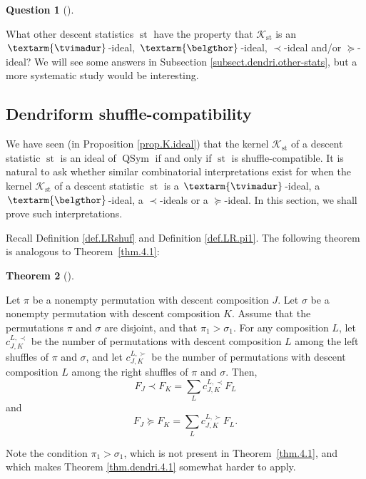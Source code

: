 \documentclass[numbers=enddot,12pt,final,onecolumn,notitlepage]{scrartcl}%
\theoremstyle{definition}
\newtheorem{theo}{Theorem}[section]
\newenvironment{theorem}[1][]
{\begin{theo}[#1]\begin{leftbar}}
{\end{leftbar}\end{theo}}
\newtheorem{quest}[theo]{Question}
\newenvironment{question}[1][]
{\begin{quest}[#1]\begin{leftbar}}
{\end{leftbar}\end{quest}}
\newenvironment{question}[1][Question]{\noindent\textbf{#1.} }{\ \rule{0.5em}{0.5em}}
\newenvironment{verlong}{}{}
\newcommand{\tvi}{\left. \textarm{\tvimadur} \right.}
\newcommand{\bel}{\left. \textarm{\belgthor} \right.}
\let\sumnonlimits\sum
\renewcommand{\sum}{\sumnonlimits\limits}
\begin{document}
\begin{verlong}
\begin{question}
What other descent statistics $\operatorname*{st}$ have the property that
$\mathcal{K}_{\operatorname*{st}}$ is an $\tvi$-ideal, $\bel$-ideal, $\left.
\prec\right.  $-ideal and/or $\left.  \succeq\right.  $-ideal? We will see
some answers in Subsection \ref{subsect.dendri.other-stats}, but a more
systematic study would be interesting.
\end{question}

\subsection{Dendriform shuffle-compatibility}

We have seen (in Proposition \ref{prop.K.ideal}) that the kernel
$\mathcal{K}_{\operatorname*{st}}$ of a descent statistic $\operatorname*{st}$
is an ideal of $\operatorname*{QSym}$ if and only if $\operatorname*{st}$ is
shuffle-compatible. It is natural to ask whether similar combinatorial
interpretations exist for when the kernel $\mathcal{K}_{\operatorname*{st}}$
of a descent statistic $\operatorname*{st}$ is a $\tvi$-ideal, a $\bel$-ideal,
a $\left.  \prec\right.  $-ideals or a $\left.  \succeq\right.  $-ideal. In
this section, we shall prove such interpretations.

Recall Definition \ref{def.LRshuf} and Definition \ref{def.LR.pi1}. The
following theorem is analogous to Theorem~\ref{thm.4.1}:

\begin{theorem}
\label{thm.dendri.4.1}Let $\pi$ be a nonempty permutation with descent
composition $J$. Let $\sigma$ be a nonempty permutation with descent
composition $K$. Assume that the permutations $\pi$ and $\sigma$ are disjoint,
and that $\pi_{1}>\sigma_{1}$. For any composition $L$, let $c_{J,K}^{L,\prec
}$ be the number of permutations with descent composition $L$ among the left
shuffles of $\pi$ and $\sigma$, and let $c_{J,K}^{L,\succ}$ be the number of
permutations with descent composition $L$ among the right shuffles of $\pi$
and $\sigma$. Then,%
\[
F_{J}\left.  \prec\right.  F_{K}=\sum_{L}c_{J,K}^{L,\prec}F_{L}%
\]
and%
\[
F_{J}\left.  \succeq\right.  F_{K}=\sum_{L}c_{J,K}^{L,\succ}F_{L}.
\]

\end{theorem}

Note the condition $\pi_{1}>\sigma_{1}$, which is not present in
Theorem~\ref{thm.4.1}, and which makes Theorem \ref{thm.dendri.4.1} somewhat
harder to apply.


\end{verlong}
\end{document}
